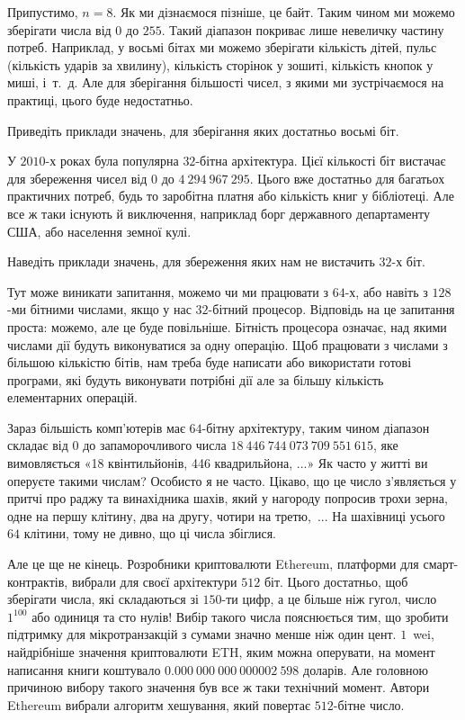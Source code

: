 Припустимо, $n=8$. Як ми дізнаємося пізніше, це байт.
Таким чином ми можемо зберігати числа від $0$ до $255$.
Такий діапазон покриває лише невеличку частину потреб.
Наприклад, у восьмі бітах ми можемо зберігати кількість дітей, пульс (кількість ударів за хвилину), кількість сторінок у зошиті, кількість кнопок у миші, і~т.~д.
Але для зберігання більшості чисел, з якими ми зустрічаємося на практиці, цього буде недостатньо.

\begin{exercise}
Приведіть приклади значень, для зберігання яких достатньо восьмі біт.
\end{exercise}

У $2010$-х роках була популярна $32$-бітна архітектура.
Цієї кількості біт вистачає для збереження чисел від $0$ до $4~294~967~295$.
Цього вже достатньо для багатьох практичних потреб, будь то заробітна платня або кількість книг у бібліотеці.
Але все ж таки існують й виключення, наприклад борг державного департаменту США, або населення земної кулі.

\begin{exercise}
Наведіть приклади значень, для збереження яких нам не вистачить $32$-х біт.
\end{exercise}

Тут може виникати запитання, можемо чи ми працювати з $64$-х, або навіть з $128$-ми бітними числами, якщо у нас $32$-бітний процесор.
Відповідь на це запитання проста: можемо, але це буде повільніше.
Бітність процесора означає, над якими числами дії будуть виконуватися за одну операцію.
Щоб працювати з числами з більшою кількістю бітів, нам треба буде написати або використати готові програми, які будуть виконувати потрібні дії але за більшу кількість елементарних операцій.

Зараз більшість комп'ютерів має $64$-бітну архітектуру, таким чином діапазон складає від $0$ до запаморочливого числа $18~446~744~073~709~551~615$, яке вимовляється «18 квінтильйонів, 446 квадрильйона, ...»
Як часто у житті ви оперуєте такими числам? Особисто я не часто.
Цікаво, що це число з'являється у притчі про раджу та винахідника шахів, який у нагороду попросив трохи зерна, одне на першу клітину, два на другу, чотири на третю,~...
На шахівниці усього $64$ клітини, тому  не дивно, що ці числа збіглися.

Але це ще не кінець.
Розробники криптовалюти Ethereum, платформи для смарт-контрактів, вибрали для своєї архітектури $512$ біт.
Цього достатньо, щоб зберігати числа, які складаються зі $150$-ти цифр, а це більше ніж гугол, число $1^{100}$ або одиниця та сто нулів!
Вибір такого числа пояснюється тим, що зробити підтримку для мікротранзакцій з сумами значно менше ніж один цент.
$1$~wei, найдрібніше значення криптовалюти ETH, яким можна оперувати, на момент написання книги коштувало $0.000~000~000~000 002~598$ доларів.
Але головною причиною вибору такого значення був все ж таки технічний момент.
Автори Ethereum вибрали алгоритм хешування, який повертає $512$-бітне число.

